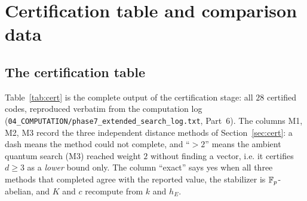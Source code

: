 \appendix
\section{Certification table and comparison data}
\label{app:tables}

\subsection{The certification table}

Table~\ref{tab:cert} is the complete output of the certification stage: all
$28$ certified codes, reproduced verbatim from the computation log
(\texttt{04\_COMPUTATION/phase7\_extended\_search\_log.txt}, Part~6). The
columns M1, M2, M3 record the three independent distance methods of
Section~\ref{sec:cert}: a dash means the method could not complete, and
``$>2$'' means the ambient quantum search (M3) reached weight $2$ without
finding a vector, i.e. it certifies $d\ge3$ as a \emph{lower} bound only.
The column ``exact'' says yes when all three methods that completed agree
with the reported value, the stabilizer is $\mathbb F_p$-abelian, and $K$ and $c$
recompute from $k$ and $h_E$.

